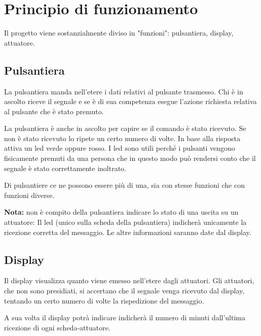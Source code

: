 \documentclass[italian]{article}
\begin{document}
	
	\section*{Principio di funzionamento}
	
	Il progetto viene sostanzialmente diviso in "funzioni": pulsantiera, display, attuatore.
	
	\subsection*{Pulsantiera}
	
	La pulsantiera manda nell'etere i dati relativi al pulsante trasmesso. Chi è in ascolto riceve il segnale e se è di sua competenza esegue l'azione richiesta relativa al pulsante che è stato premuto.
	
	La pulsantiera è anche in ascolto per capire se il comando è stato ricevuto. Se non è stato ricevuto lo ripete un certo numero di volte. In base alla risposta attiva un led verde oppure rosso. I led sono utili perché i pulsanti vengono fisicamente premuti da una persona che in questo modo può rendersi conto che il segnale è stato correttamente inoltrato.
	
	Di pulsantiere ce ne possono essere più di una, sia con stesse funzioni che con funzioni diverse.
	
	\bigskip
	
	\textbf{Nota:} non è compito della pulsantiera indicare lo stato di una uscita su un attuatore: Il led (unico sulla scheda della pulsantiera) indicherà unicamente la ricezione corretta del messaggio. Le altre informazioni saranno date dal display.
	
	\subsection*{Display}
	
	Il display visualizza quanto viene emesso nell'etere dagli attuatori. {\scriptsize Gli attuatori, che non sono presidiati, si accertano che il segnale venga ricevuto dal display, tentando un certo numero di volte la rispedizione del messaggio.}
	
	A sua volta il display potrà indicare indicherà il numero di minuti dall'ultima ricezione di ogni scheda-attuatore.
    
%    
    
\end{document}
